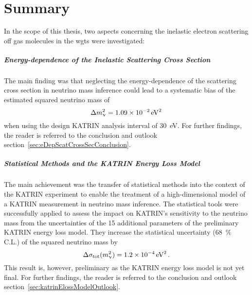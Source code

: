 \chapter{Summary}
\label{sec:conclusion}
In the scope of this thesis, two aspects concerning the inelastic electron scattering off gas molecules in the \gls{wgts} were investigated:

\paragraph{Energy-dependence of the Inelastic Scattering Cross Section}
The main finding was that neglecting the energy-dependence of the scattering cross section in neutrino mass inference could lead to a systematic bias of the estimated squared neutrino mass of
\begin{equation*}
\Delta m_\upnu^2 = \SI{1.09e-2}{eV^2}
\end{equation*}
when using the design KATRIN analysis interval of \SI{30}{eV}. For further findings, the reader is referred to the conclusion and outlook section~\ref{sec:eDepScatCrossSecConclusion}.


\paragraph{Statistical Methods and the KATRIN Energy Loss Model}
The main achievement was the transfer of statistical methods into the context of the KATRIN experiment to enable the treatment of a high-dimensional model of a KATRIN measurement in neutrino mass inference. The statistical tools were successfully applied to assess the impact on KATRIN's sensitivity to the neutrino mass from the uncertainties of the 15 additional parameters of the preliminary KATRIN energy loss model. They increase the statistical uncertainty (\SI{68}{\percent} C.L.) of the squared neutrino mass by
\begin{equation*}
\Delta \sigma_\mathrm{tot}(m_\upnu^2) = \SI{1.2e-4}{eV^2}
\text{\,.} 
\end{equation*} 
This result is, however, preliminary as the KATRIN energy loss model is not yet final. For further findings, the reader is referred to the conclusion and outlook section~\ref{sec:katrinElossModelOutlook}.
